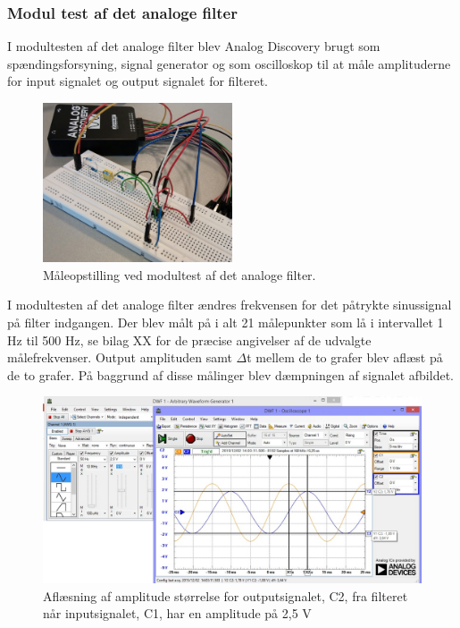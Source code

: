 \subsubsection{Modul test af det analoge filter}
I modultesten af det analoge filter blev Analog Discovery brugt som spændingsforsyning, signal generator og som oscilloskop til at måle amplituderne for input signalet og output signalet for filteret.\\
\begin{figure}[H]
	\centering
	\includegraphics[width=0.5\textwidth]{Figurer/Hardware/FilterTest}
	\caption{Måleopstilling ved modultest af det analoge filter.}
	\label{fig:FilterTest}
\end{figure}
I modultesten af det analoge filter ændres frekvensen for det påtrykte sinussignal på filter indgangen. Der blev målt på i alt 21 målepunkter som lå i intervallet 1 Hz til 500 Hz, se bilag XX for de præcise angivelser af de udvalgte målefrekvenser. Output amplituden samt $\Delta$t mellem de to grafer blev aflæst på de to grafer. På baggrund af disse målinger blev dæmpningen af signalet afbildet. 
\begin{figure}[H]
	\centering
	\includegraphics[width=1\textwidth]{Figurer/Hardware/AnalogScreenFilterAmp}
	\caption{Aflæsning af amplitude størrelse for outputsignalet, C2, fra filteret når inputsignalet, C1, har en amplitude på 2,5 V}
	\label{fig:FilterAmplitude}
\end{figure}
